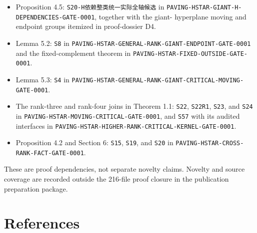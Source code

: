 \documentclass[10pt]{article}
\begin{document}
\begin{itemize}
\item Proposition 4.5: \texttt{S20-H{\cjkfont 依\allowbreak{}赖\allowbreak{}整\allowbreak{}类\allowbreak{}统\allowbreak{}一\allowbreak{}实\allowbreak{}际\allowbreak{}全\allowbreak{}轴\allowbreak{}候\allowbreak{}选}} in
\texttt{PAVING-\allowbreak{}HSTAR-\allowbreak{}GIANT-\allowbreak{}H-\allowbreak{}DEPENDENCIES-\allowbreak{}GATE-\allowbreak{}0001}, together with the giant-
hyperplane moving and endpoint groups itemized in proof-dossier D4.
\item Lemma 5.2: \texttt{S8} in \texttt{PAVING-\allowbreak{}HSTAR-\allowbreak{}GENERAL-\allowbreak{}RANK-\allowbreak{}GIANT-\allowbreak{}ENDPOINT-\allowbreak{}GATE-\allowbreak{}0001}
and the fixed-complement theorem in \texttt{PAVING-\allowbreak{}HSTAR-\allowbreak{}FIXED-\allowbreak{}OUTSIDE-\allowbreak{}GATE-\allowbreak{}0001}.
\item Lemma 5.3: \texttt{S4} in
\texttt{PAVING-\allowbreak{}HSTAR-\allowbreak{}GENERAL-\allowbreak{}RANK-\allowbreak{}GIANT-\allowbreak{}CRITICAL-\allowbreak{}MOVING-\allowbreak{}GATE-\allowbreak{}0001}.
\item The rank-three and rank-four joins in Theorem 1.1: \texttt{S22}, \texttt{S22R1}, \texttt{S23},
and \texttt{S24} in \texttt{PAVING-\allowbreak{}HSTAR-\allowbreak{}MOVING-\allowbreak{}CRITICAL-\allowbreak{}GATE-\allowbreak{}0001}, and \texttt{S57}
with its audited interfaces in
\texttt{PAVING-\allowbreak{}HSTAR-\allowbreak{}HIGHER-\allowbreak{}RANK-\allowbreak{}CRITICAL-\allowbreak{}KERNEL-\allowbreak{}GATE-\allowbreak{}0001}.
\item Proposition 4.2 and Section 6: \texttt{S15}, \texttt{S19}, and \texttt{S20} in
\texttt{PAVING-\allowbreak{}HSTAR-\allowbreak{}CROSS-\allowbreak{}RANK-\allowbreak{}FACT-\allowbreak{}GATE-\allowbreak{}0001}.
\end{itemize}

These are proof dependencies, not separate novelty claims.  Novelty and source
coverage are recorded outside the 216-file proof closure in the publication
preparation package.

\section*{References}
\end{document}
